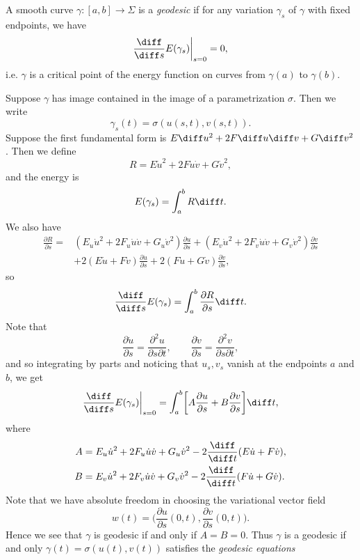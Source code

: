 \documentclass[12pt]{article}
\begin{document}
\begin{definition}
	A smooth curve $\gamma : [a, b] \to \Sigma$ is a \emph{geodesic} if for any variation $\gamma_s$ of $\gamma$ with fixed endpoints, we have
	\[
	\frac{\diff}{\diff s} E(\gamma_s) \biggr|_{s = 0} = 0,
	\]
	i.e. $\gamma$ is a critical point of the energy function on curves from $\gamma(a)$ to $\gamma(b)$.
\end{definition}

Suppose $\gamma$ has image contained in the image of a parametrization $\sigma$. Then we write
\[
\gamma_s(t) = \sigma(u(s, t), v(s, t)).
\]
Suppose the first fundamental form is $E \diff u^2 + 2 F \diff u \diff v + G \diff v^2$. Then we define
\[
R = E \dot u^2 + 2 F \dot u \dot v + G \dot v^2,
\]
and the energy is
\[
E(\gamma_s) = \int_{a}^{b} R \diff t.
\]
We also have
\begin{align*}
	\frac{\partial R}{\partial s} = &(E_u \dot u^2 + 2 F_u \dot u \dot v + G_u \dot v^2) \frac{\partial u}{\partial s} + (E_v \dot u^2 + 2 F_v \dot u \dot v + G_v \dot v^2) \frac{\partial v}{\partial s} \\
				      &+ 2 (E \dot u + F \dot v) \frac{\partial \dot u}{\partial s} + 2 (F \dot u + G \dot v) \frac{\partial \dot v}{\partial s},
\end{align*}
so
\[
\frac{\diff}{\diff s}E(\gamma_s) = \int_{a}^{b} \frac{\partial R}{\partial s} \diff t.
\]
Note that
\[
\frac{\partial \dot u}{\partial s} = \frac{\partial^2 u}{\partial s \partial t}, \qquad \frac{\partial \dot v}{\partial s} = \frac{\partial^2 v}{\partial s \partial t},
\]
and so integrating by parts and noticing that $u_s, v_s$ vanish at the endpoints $a$ and $b$, we get
\[
	\frac{\diff}{\diff s} E(\gamma_s) \biggr|_{s = 0} = \int_{a}^{b} \biggl[ A \frac{\partial u}{\partial s} + B \frac{\partial v}{\partial s} \biggr] \diff t,
\]
where
\begin{align*}
	A &= E_u \dot u^2 + 2 F_u \dot u \dot v + G_u \dot v^2 - 2 \frac{\diff}{\diff t} (E \dot u + F \dot v), \\
	B &= E_v \dot u ^2 + 2 F_v \dot u \dot v + G_v \dot v^2 - 2 \frac{\diff}{\diff t} (F \dot u + G \dot v).
\end{align*}
Note that we have absolute freedom in choosing the variational vector field
\[
w(t) = \biggl( \frac{\partial u}{\partial s}(0, t), \frac{\partial v}{\partial s}(0,t) \biggr).
\]
Hence we see that $\gamma$ is geodesic if and only if $A = B = 0$. Thus $\gamma$ is a geodesic if and only $\gamma(t) = \sigma(u(t), v(t))$ satisfies the \emph{geodesic equations}
\end{document}
